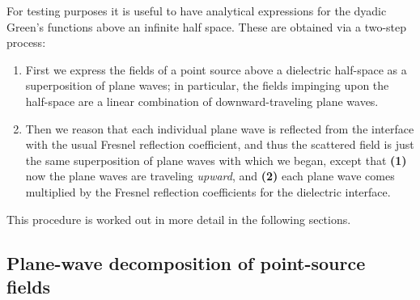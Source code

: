\documentclass[letterpaper]{article}
\begin{document}
For testing purposes it is useful to have analytical expressions
for the dyadic Green's functions above an infinite half space.
These are obtained via a two-step process:

\begin{enumerate}
 \item First we express the fields of a point source above a 
       dielectric half-space as a superposition of plane waves;
       in particular, the fields impinging upon the half-space
       are a linear combination of downward-traveling plane waves.
 \item Then we reason that each individual plane wave is
       reflected from the interface with the usual Fresnel 
       reflection coefficient, and thus the scattered field
       is just the same superposition of plane waves with which
       we began, except that \textbf{(1)} now the plane waves
       are traveling \textit{upward}, and \textbf{(2)} each plane
       wave comes multiplied by the Fresnel reflection coefficients    
       for the dielectric interface.
\end{enumerate}

This procedure is worked out in more detail in the following
sections.

\subsection{Plane-wave decomposition of point-source fields}
\end{document}
